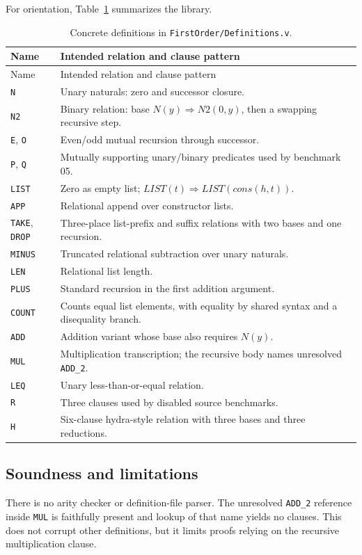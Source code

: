 \documentclass[11pt,oneside]{book}
\DeclareRobustCommand{\code}[1]{\nolinkurl{#1}}
\DeclareRobustCommand{\file}[1]{\nolinkurl{#1}}
\newcommand{\soundlim}{\subsection*{Soundness and limitations}}
\begin{document}
For orientation, Table~\ref{tab:definitions} summarizes the library.
\begin{longtable}{@{}p{}p{}@{}}
\caption{Concrete definitions in \file{FirstOrder/Definitions.v}.}
\label{tab:definitions}\\
\toprule
Name & Intended relation and clause pattern\\
\midrule
\endfirsthead
\toprule
Name & Intended relation and clause pattern\\
\midrule
\endhead
\code{N} & Unary naturals: zero and successor closure.\\
\code{N2} & Binary relation: base \(N(y)\Rightarrow N2(0,y)\), then a swapping recursive step.\\
\code{E}, \code{O} & Even/odd mutual recursion through successor.\\
\code{P}, \code{Q} & Mutually supporting unary/binary predicates used by benchmark 05.\\
\code{LIST} & Zero as empty list; \(LIST(t)\Rightarrow LIST(cons(h,t))\).\\
\code{APP} & Relational append over constructor lists.\\
\code{TAKE}, \code{DROP} & Three-place list-prefix and suffix relations with two bases and one recursion.\\
\code{MINUS} & Truncated relational subtraction over unary naturals.\\
\code{LEN} & Relational list length.\\
\code{PLUS} & Standard recursion in the first addition argument.\\
\code{COUNT} & Counts equal list elements, with equality by shared syntax and a disequality branch.\\
\code{ADD} & Addition variant whose base also requires \(N(y)\).\\
\code{MUL} & Multiplication transcription; the recursive body names unresolved \code{ADD_2}.\\
\code{LEQ} & Unary less-than-or-equal relation.\\
\code{R} & Three clauses used by disabled source benchmarks.\\
\code{H} & Six-clause hydra-style relation with three bases and three reductions.\\
\bottomrule
\end{longtable}

\soundlim

There is no arity checker or definition-file parser.  The unresolved
\code{ADD_2} reference inside \code{MUL} is faithfully present and lookup of
that name yields no clauses.  This does not corrupt other definitions, but it
limits proofs relying on the recursive multiplication clause.
\end{document}
